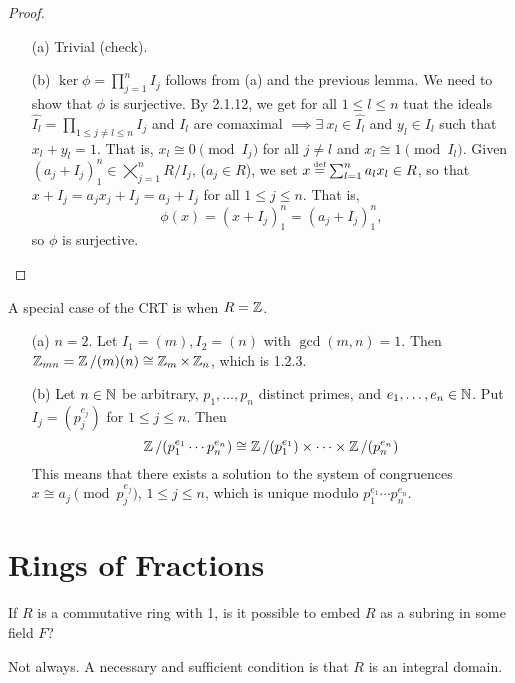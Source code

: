 \documentclass[11pt]{book}
\theoremstyle{definition}   \newtheorem{defn}[counter]{Definition} %
\newcommand\myeq{\mathrel{\overset{\makebox[0pt]{\mbox{\normalfont\tiny\sffamily \textrm{def}}}}{=}}}
\newcommand{\vs}{\vspace{8pt}}
\numberwithin{counter}{chapter}
\begin{document}
\begin{proof}\
\begin{enumerate}
\item[(a)] Trivial (check).
\item[(b)] $\ker \phi = \prod_{j=1}^n I_j$ follows from (a) and the previous lemma. We need to show that $\phi$ is surjective. By 2.1.12, we get for all $1 \leq l \leq n$ tuat the ideals $\widehat{I_l} = \prod_{1 \leq j \ne l \leq n} I_j$ and $I_l$ are comaximal $\implies \exists \ x_l \in \widehat{I_l}$ and $y_l \in I_l$ such that $x_l + y_l = 1$. That is, $x_l \cong 0 \pmod{I_j}$ for all $j \ne l$ and $x_l \cong 1 \pmod{I_l}$. Given $(a_j + I_j)_1^n \in \bigtimes_{j=1}^n R/I_j$, ($a_j \in R$), we set $x \myeq \sum_{l=1}^n a_l x_l \in R$, so that $x+I_j = a_jx_j + I_j = a_j + I_j$ for all $1 \leq j \leq n$. That is,
	\[\phi(x) = (x+I_j)_1^n = (a_j + I_j)_1^n, \]
so $\phi$ is surjective.
\end{enumerate}
\end{proof}

\vs

\begin{remark*}
A special case of the CRT is when $R = \operatorname{\mathbb{Z}}$.
\begin{enumerate}
\item[(a)] $n = 2$. Let $I_1 = (m), I_2 = (n)$ with $\gcd(m,n) = 1$. Then $\operatorname{\mathbb{Z}}_{mn} = \operatorname{\mathbb{Z}}/(m)(n) \cong \operatorname{\mathbb{Z}}_m \times \operatorname{\mathbb{Z}}_n$, which is 1.2.3.
\item[(b)] Let $n \in \operatorname{\mathbb{N}}$ be arbitrary, $p_1, \dots, p_n$ distinct primes, and $e_1,\dots,e_n \in \operatorname{\mathbb{N}}$. Put $I_j = (p_j^{e_j})$ for $1 \leq j \leq n$. Then
	\[\operatorname{\mathbb{Z}}/(p_1^{e_1} \cdots p_n^{e_n}) \cong \operatorname{\mathbb{Z}}/(p_1^{e_1}) \times \dots \times \operatorname{\mathbb{Z}}/(p_n^{e_n}) \]
This means that there exists a solution to the system of congruences $x \cong a_j \pmod{p_j^{e_j}}$, $1 \leq j \leq n$, which is unique modulo $p_1^{e_1} \cdots p_n^{e_n}$.
\end{enumerate}
\end{remark*}



\chapter{ \null Rings of Fractions}


 If $R$ is a commutative ring with 1, is it possible to embed $R$ as a subring in some field $F$?

 Not always. A necessary and sufficient condition is that $R$ is an integral domain.
\end{document}
